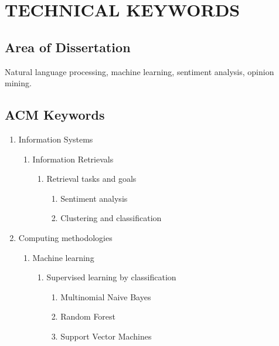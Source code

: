 \documentclass[oneside,a4paper,12pt]{pictreport}
\begin{document}
\chapter{TECHNICAL KEYWORDS}
\section{Area of Dissertation}
Natural language processing, machine learning, sentiment analysis, opinion mining.

\section{ACM Keywords}
\begin{enumerate}[label=\Alph*]
    \item Information Systems
    \begin{enumerate}[label*=.\arabic*]
    \item Information Retrievals
    \begin{enumerate}[label*=.\arabic*]
        \item Retrieval tasks and goals
        \begin{enumerate}[label*=.\arabic*]
            \item Sentiment analysis
            \item Clustering and classification
        \end{enumerate}
        \end{enumerate}
    \end{enumerate}
    \item Computing methodologies
        \begin{enumerate}[label*=.\arabic*]
            
            \item Machine learning
            \begin{enumerate}[label*=.\arabic*]
                \item Supervised learning by classification
                \begin{enumerate}[label*=.\arabic*]
                    \item Multinomial Naive Bayes
                    \item Random Forest
                    \item Support Vector Machines
                \end{enumerate}
            \end{enumerate}
        \end{enumerate}
    \end{enumerate}
\end{document}
